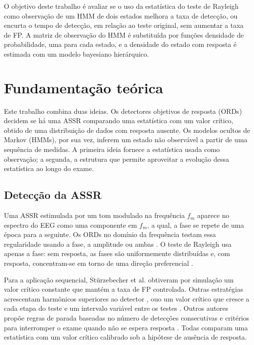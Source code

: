 \documentclass[conference]{IEEEtran}
\begin{document}
O objetivo deste trabalho é avaliar se o uso da estatística do teste de Rayleigh como observação de um HMM de dois estados melhora a taxa de detecção, ou encurta o tempo de detecção, em relação ao teste original, sem aumentar a taxa de FP. A matriz de observação do HMM é substituída por funções densidade de probabilidade, uma para cada estado, e a densidade do estado com resposta é estimada com um modelo bayesiano hierárquico.

\section{Fundamentação teórica}

Este trabalho combina duas ideias. Os detectores objetivos de resposta (ORDs) decidem se há uma ASSR comparando uma estatística com um valor crítico, obtido de uma distribuição de dados com resposta ausente. Os modelos ocultos de Markov (HMMs), por sua vez, inferem um estado não observável a partir de uma sequência de medidas. A primeira ideia fornece a estatística usada como observação; a segunda, a estrutura que permite aproveitar a evolução dessa estatística ao longo do exame.

\subsection{Detecção da ASSR}

Uma ASSR estimulada por um tom modulado na frequência $f_m$ aparece no espectro do EEG como uma componente em $f_m$, a qual, a fase se repete de uma época para a seguinte. Os ORDs no domínio da frequência testam essa regularidade usando a fase, a amplitude ou ambas \cite{dobie1993,sturzebecher1999,cebulla2006}. O teste de Rayleigh usa apenas a fase: sem resposta, as fases são uniformemente distribuídas e, com resposta, concentram-se em torno de uma direção preferencial \cite{mardia2000}.

Para a aplicação sequencial, Stürzebecher et al. \cite{sturzebecher2005} obtiveram por simulação um valor crítico constante que mantém a taxa de FP controlada. Outras estratégias acrescentam harmônicos superiores ao detector \cite{cebulla2006}, ouo um valor crítico que cresce a cada etapa do teste \cite{sturzebecher2013} e um intervalo variável entre os testes \cite{cebulla2015}. Outros autores propõe regras de parada baseadas no número de detecções consecutivas \cite{zanotelli2020} e critérios para interromper o exame quando não se espera resposta \cite{vaz2024}. Todas comparam uma estatística com um valor crítico calibrado sob a hipótese de ausência de resposta.
\end{document}
